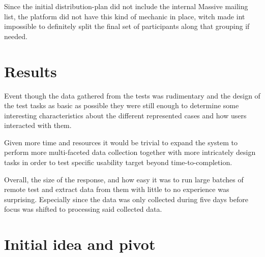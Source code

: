   Since the initial distribution-plan did not include the internal Massive
  mailing list, the platform did not have this kind of mechanic in place, witch
  made int impossible to definitely split the final set of participants along
  that grouping if needed.


%


\section{Results}

  Event though the data gathered from the tests was rudimentary and the
  design of the test tasks as basic as possible they were still enough to
  determine some interesting characteristics about the different represented
  cases and how users interacted with them.


  Given more time and resources it would be trivial to expand the system to
  perform more multi-faceted data collection together with more intricately
  design tasks in order to test specific usability target beyond
  time-to-completion.

  Overall, the size of the response, and how easy it was to run large batches
  of remote test and extract data from them with little to no experience was
  surprising. Especially since the data was only collected during five days
  before focus was shifted to processing said collected data.

%
\section{Initial idea and pivot}

